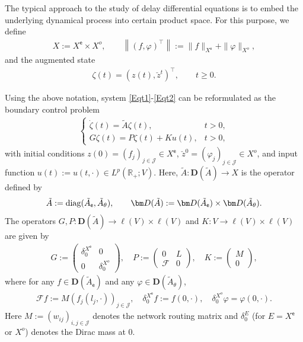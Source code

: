 \documentclass[onecolumn]{autart}
\def\R{{\mathbb{R}}}
\def\calF{{\mathcal{F}}}
\def\R{\mathbb R}
\numberwithin{equation}{section}
\begin{document}
	The typical approach to the study of delay differential equations is to embed the underlying dynamical process into certain product space. For this purpose, we define
	\begin{align*}
		X :=X^{\mathsf{e}}\times X^{o},\qquad \left\|(f, \varphi)^{\top}\right\|:=\|f\|_{X^{\mathsf{e}}}+\|\varphi\|_{X^{o}},
	\end{align*}
	and the augmented state
	\begin{align*}
		\zeta(t)=(z(t), \check{z}^{t})^{\top},\qquad t\ge 0.
	\end{align*}
	
	Using the above notation,  system \eqref{Eqt1}-\eqref{Eqt2} can be reformulated as the boundary control problem
	\begin{align}\label{Main-system1}
		\begin{cases}
			\dot{\zeta}(t)= \tilde{A}\zeta(t),& t> 0,\\
			G \zeta(t)=P \zeta(t)+Ku(t), & t> 0,
		\end{cases}
	\end{align}
	with initial conditions $z(0)=(f_j)_{j\in \mathcal{J}}\in X^{\mathsf{e}}$, $\check{z}^0=(\varphi_j)_{j\in \mathcal{J}}\in X^{o}$, and input function $u(t):=u(t,\cdot)\in L^p(\R_+;V)$.
	Here, $\tilde{A}:{\bm D}(\tilde{A})\to X$ is the operator defined by
	\begin{align}\label{A_M}
		\tilde{A}:={\rm diag}(\tilde{A}_{\mathsf{e}},\tilde{A}_{\theta}), \qquad {\bm D}(\tilde{A}):={\bm D}(\tilde{A}_{\mathsf{e}})\times {\bm D}(\tilde{A}_{\theta}).
	\end{align}
	The operators  $G,P:{\bm D}(\tilde{A}) \to\bm{\ell}(V)\times \bm{\ell}(V)$ and $K:V\to \bm{\ell}(V)\times \bm{\ell}(V)$ are given by
	\begin{align}\label{G,Ga}
		G:=\begin{pmatrix}
			\delta_{0}^{X^{\mathsf{e}}} & 0 \\
			0 & \delta_{0}^{X^{o}}
		\end{pmatrix},\quad
		P:= \begin{pmatrix}
			0 & 	{L} \\
			\calF & 0
		\end{pmatrix},\quad K:= \begin{pmatrix}
			M \\
			0
		\end{pmatrix},
	\end{align}
	where for any $f\in {\bm D}(\tilde{A}_{\mathsf{e}})$ and any $\varphi\in {\bm D}(\tilde{A}_{\theta})$,
	\begin{align*}%
		\mathcal{F}f:=M (f_j(l_j,\cdot))_{j\in \mathcal{J}},\quad
		\delta_{0}^{X^{\mathsf{e}}}f:=f(0,\cdot),\quad
		\delta_{0}^{X^{o}}\varphi=\varphi(0,\cdot).
	\end{align*}
      Here $M:=(w_{ij})_{i,j\in \mathcal{J}}$ denotes the network routing matrix and $\delta_{0}^E$ (for $E=X^{\mathsf{e}}$ or $X^{o}$) denotes the Dirac mass at $0$.
\end{document}
